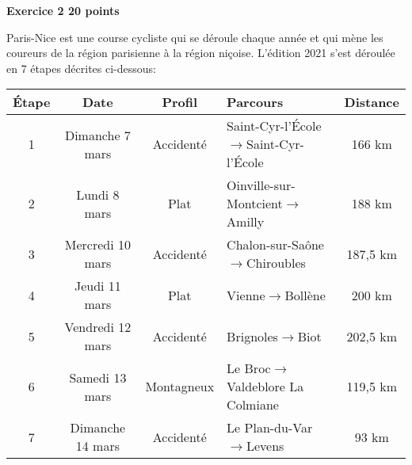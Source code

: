 \textbf{\large Exercice 2 \hfill 20 points}

\medskip

Paris-Nice est une course cycliste qui se déroule chaque année et qui mène les coureurs de la région parisienne à la région niçoise. L'édition 2021 s'est déroulée en 7 étapes décrites ci-dessous:

\begin{center}
\begin{tabularx}{\linewidth}{|c|c|c|>{\small}X|c|}\hline
\textbf{Étape} &\textbf{Date}&\textbf{Profil}&\textbf{Parcours}&\textbf{Distance}
\\ \hline
1&Dimanche 7 mars&Accidenté&\footnotesize Saint-Cyr-l'École$\to$Saint-Cyr-l'École&166 km\\ \hline
2&Lundi 8 mars&Plat&Oinville-sur-Montcient$\to$Amilly&188 km\\ \hline
3&Mercredi 10 mars&Accidenté& Chalon-sur-Saône$\to$Chiroubles&187,5 km\\ \hline
4&Jeudi 11 mars &Plat&Vienne$\to$Bollène&200 km\\ \hline
5&Vendredi 12 mars&Accidenté&Brignoles$\to$Biot&202,5 km\\ \hline
6&Samedi 13 mars&Montagneux&Le Broc$\to$Valdeblore La Colmiane&119,5 km\\ \hline
7&Dimanche 14 mars&Accidenté& Le Plan-du-Var$\to$Levens&93 km\\ \hline
\end{tabularx}
\end{center}

